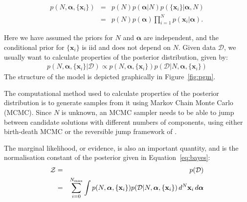 \documentclass[letterpaper, 11pt]{article}
\newcommand{\hyperparams}{\boldsymbol{\alpha}}
\newcommand{\xx}{\mathbf{x}}
\begin{document}
\begin{eqnarray}
p(N, \hyperparams, \{\xx_i\}) &=& p(N) p(\hyperparams | N) p(\{\xx_i\} | \hyperparams, N) \\
&=& p(N) p(\hyperparams) \prod_{i=1}^N p(\xx_i | \hyperparams).
\end{eqnarray}

Here we have assumed the priors for $N$ and $\hyperparams$ are independent, and
the conditional prior for $\{\xx_i\}$ is iid and does not depend on $N$.
Given data $\mathcal{D}$, we usually want to calculate properties of the
posterior distribution, given by:
\begin{eqnarray}
p(N, \hyperparams, \{\xx_i\} | \mathcal{D}) \propto
p(N, \hyperparams, \{\xx_i\})
p(\mathcal{D} | N, \hyperparams, \{\xx_i\})\label{eq:bayes}
\end{eqnarray}
The structure of the model is depicted graphically in Figure~\ref{fig:pgm}.

The computational method used to calculate properties of the posterior distribution
is to generate samples from it using Markov Chain Monte Carlo (MCMC). Since
$N$ is unknown, an MCMC sampler needs to be able to jump between candidate
solutions with different numbers of components, using either birth-death MCMC
\citep{birthdeath} or the reversible jump framework of \citet{rjmcmc}.

The marginal likelihood, or evidence, is also an important quantity, and is
the normalisation constant of the posterior given in Equation~\ref{eq:bayes}:
\begin{eqnarray}
\mathcal{Z} &=& p(\mathcal{D})\\
&=& \sum_{i=0}^{N_{\rm max}} \int
p(N, \hyperparams, \{\xx_i\})p(\mathcal{D} | N, \hyperparams, \{\xx_i\})
\, d^N \xx_i \, d\hyperparams \label{eq:evidence}
\end{eqnarray}
\end{document}
